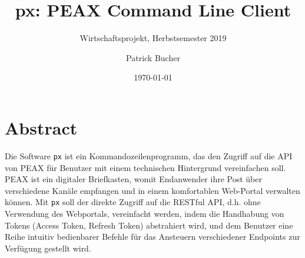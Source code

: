 \author{Patrick Bucher}
\title{px: PEAX Command Line Client}
\subtitle{Wirtschaftsprojekt, Herbstsemester 2019}
\date{\today}
\maketitle

\section*{Abstract}

Die Software \texttt{px} ist ein Kommandozeilenprogramm, das den Zugriff auf die API von PEAX für Benutzer mit einem technischen Hintergrund vereinfachen soll. PEAX ist ein digitaler Briefkasten, womit Endanwender ihre Post über verschiedene Kanäle empfangen und in einem komfortablen Web-Portal verwalten können. Mit \texttt{px} soll der direkte Zugriff auf die RESTful API, d.h. ohne Verwendung des Webportals, vereinfacht werden, indem die Handhabung von Tokens (Access Token, Refresh Token) abstrahiert wird, und dem Benutzer eine Reihe intuitiv bedienbarer Befehle für das Ansteuern verschiedener Endpoints zur Verfügung gestellt wird.

